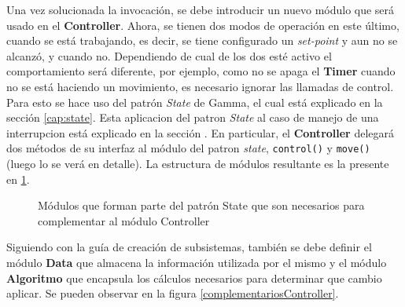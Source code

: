 Una vez solucionada la invocación, se debe introducir un nuevo módulo que será usado en el \textbf{Controller}. Ahora, se tienen dos modos de operación en este último, cuando se está trabajando, es decir, se tiene configurado un \textit{set-point} y aun no se alcanzó, y cuando no. Dependiendo de cual de los dos esté activo el comportamiento será diferente, por ejemplo, como no se apaga el \textbf{Timer} cuando no se está haciendo un movimiento, es necesario ignorar las llamadas de control. Para esto se hace uso del patrón \textit{State} de Gamma\cite{Gamma:1995:DPE:186897}, el cual está explicado en la sección \ref{cap:state}. Esta aplicacion del patron \textit{State} al caso de manejo de una interrupcion está explicado en la sección . En particular, el \textbf{Controller} delegará dos métodos de su interfaz al módulo del patron \textit{state}, \verb|control()| y \verb|move()| (luego lo se verá en detalle). La estructura de módulos resultante es la presente en \ref{operationState}.

\begin{figure}[h]
\caption{Módulos que forman parte del patrón State que son necesarios para complementar al módulo Controller}
\label{operationState}
\begin{center}
\end{center}
\end{figure}

Siguiendo con la guía de creación de subsistemas, también se debe definir el módulo \textbf{Data} que almacena la información utilizada por el mismo y el módulo \textbf{Algoritmo} que encapsula los cálculos necesarios para determinar que cambio aplicar. Se pueden observar en la figura \ref{complementariosController}.

